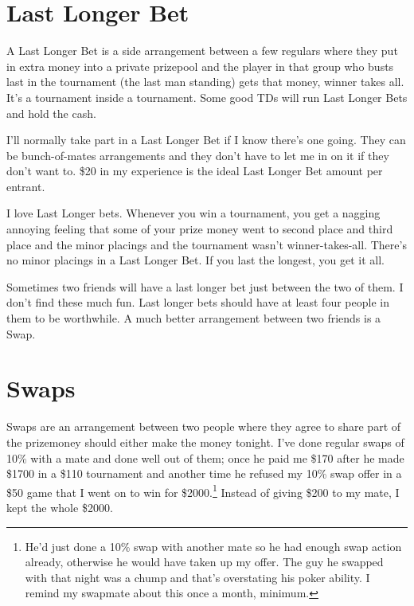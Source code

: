 \section{Last Longer Bet}

A Last Longer Bet is a side arrangement between a few regulars
where they put in extra money into a private prizepool and the player
in that group who busts last in the tournament (the last man standing)
gets that money, winner takes all. It's a tournament inside a tournament.
Some good TDs will run Last Longer Bets and hold the cash.

I'll normally take part in a Last Longer Bet if I know there's one
going. They can be bunch-of-mates arrangements and
they don't have to let me in on it if they don't want to. \$20 in my
experience is the ideal Last Longer Bet amount per entrant.

I love Last Longer bets. Whenever you win a tournament, you get a
nagging annoying feeling that some of your prize money went to second
place and third place and the minor placings and the tournament wasn't
winner-takes-all. There's no minor placings in a Last Longer Bet. If
you last the longest, you get it all.

Sometimes two friends will have a last longer bet just between the two
of them. I don't find these much fun. Last longer bets should have at
least four people in them to be worthwhile. A much better arrangement
between two friends is a Swap.

\newpage

\section{Swaps}


Swaps are an arrangement between two people where they
agree to share part of the prizemoney should
either make the money tonight. I've done regular swaps of 10\% with a mate and
done well out of them; once he paid me
\$170 after he made \$1700 in a \$110 tournament and another time
he refused my 10\% swap offer in a \$50 game that I
went on to win for \$2000.\footnote{He'd
just done a 10\% swap with another mate so he had enough swap action
already, otherwise he would have taken up my offer. The
guy he swapped with that night was a chump and that's
overstating his poker ability. I remind my swapmate about this once
a month, minimum.} Instead of giving \$200 to my mate, I kept the whole
\$2000.

